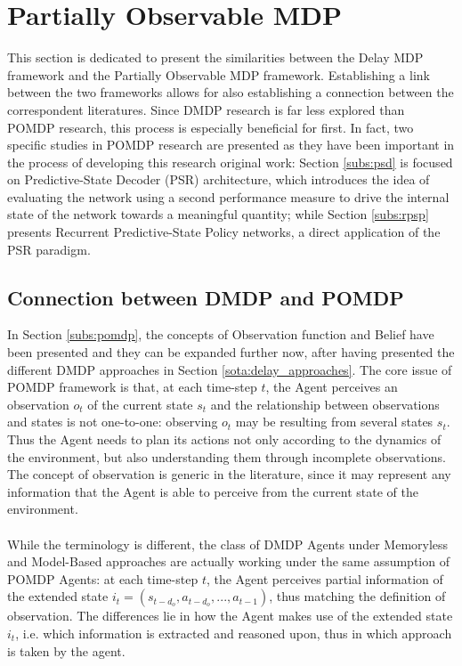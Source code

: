     \newpage
    \section{Partially Observable MDP}
        \label{sota:pomdp}
        
        This section is dedicated to present the similarities between the Delay MDP framework and the Partially Observable MDP framework. Establishing a link between the two frameworks allows for also establishing a connection between the correspondent literatures. Since DMDP research is far less explored than POMDP research, this process is especially beneficial for first. In fact, two specific studies in POMDP research are presented as they have been important in the process of developing this research original work: Section \ref{subs:psd} is focused on Predictive-State Decoder (PSR) architecture, which introduces the idea of evaluating the network using a second performance measure to drive the internal state of the network towards a meaningful quantity; while Section \ref{subs:rpsp} presents Recurrent Predictive-State Policy networks, a direct application of the PSR paradigm.
        
        \subsection{Connection between DMDP and POMDP}
            In Section \ref{subs:pomdp}, the concepts of Observation function and Belief have been presented and they can be expanded further now, after having presented the different DMDP approaches in Section \ref{sota:delay_approaches}. The core issue of POMDP framework is that, at each time-step $t$, the Agent perceives an observation $o_t$ of the current state $s_t$ and the relationship between observations and states is not one-to-one: observing $o_t$ may be resulting from several states $s_t$. Thus the Agent needs to plan its actions not only according to the dynamics of the environment, but also understanding them through incomplete observations. The concept of observation is generic in the literature, since it may represent any information that the Agent is able to perceive from the current state of the environment.
            \\\\
            While the terminology is different, the class of DMDP Agents under Memoryless and Model-Based approaches are actually working under the same assumption of POMDP Agents: at each time-step $t$, the Agent perceives partial information of the extended state $i_t = (s_{t-d_o}, a_{t-d_o}, ..., a_{t-1})$, thus matching the definition of observation. The differences lie in how the Agent makes use of the extended state $i_t$, i.e. which information is extracted and reasoned upon, thus in which approach is taken by the agent.
            
